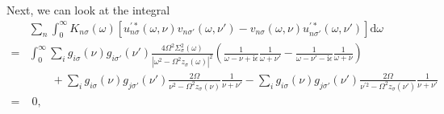 Next, we can look at the integral
\begin{equation}
\begin{split}
&\sum_n\int_0^\infty K_{n\sigma}(\omega)\left[u^{\prime*}_{n\sigma}(\omega,\nu)v_{n\sigma'}(\omega,\nu') - v_{n\sigma}(\omega,\nu)u^{\prime*}_{n\sigma'}(\omega,\nu')\right]\mathrm{d}\omega\\
= &\int_0^\infty\sum_ig_{i\sigma}(\nu)g_{i\sigma'}(\nu')\frac{4\Omega^2\Sigma_\sigma^2(\omega)}{|\omega^2 - \Omega^2z_\sigma(\omega)|^2}\left(\frac{1}{\omega - \nu  + \mathrm{i}\epsilon}\frac{1}{\omega + \nu'} - \frac{1}{\omega - \nu' - \mathrm{i}\epsilon}\frac{1}{\omega + \nu }\right)\\
&\qquad + \sum_ig_{i\sigma}(\nu)g_{j\sigma'}(\nu')\frac{2\Omega}{\nu ^2 - \Omega^2z_\sigma(\nu )}\frac{1}{\nu  + \nu'} - \sum_ig_{i\sigma}(\nu)g_{j\sigma'}(\nu')\frac{2\Omega}{\nu^{\prime2} - \Omega^2z_\sigma(\nu')}\frac{1}{\nu  + \nu'}\\
= &\;0,
\end{split}
\end{equation}
